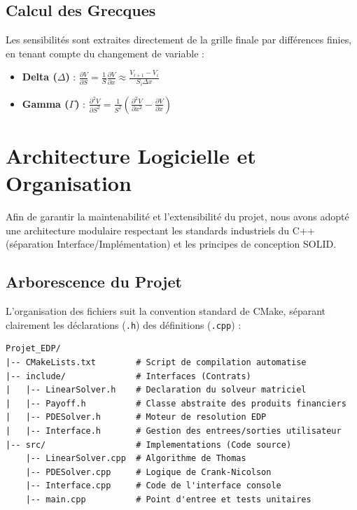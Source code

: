 \documentclass[a4paper,12pt]{article}
\begin{document}
\subsection{Calcul des Grecques}
Les sensibilités sont extraites directement de la grille finale par différences finies, en tenant compte du changement de variable :
\begin{itemize}
    \item \textbf{Delta ($\Delta$)} : $\frac{\partial V}{\partial S} = \frac{1}{S} \frac{\partial V}{\partial x} \approx \frac{V_{i+1}-V_i}{S_i \Delta x}$
    \item \textbf{Gamma ($\Gamma$)} : $\frac{\partial^2 V}{\partial S^2} = \frac{1}{S^2} \left( \frac{\partial^2 V}{\partial x^2} - \frac{\partial V}{\partial x} \right)$
\end{itemize}

\newpage
\section{Architecture Logicielle et Organisation}

Afin de garantir la maintenabilité et l'extensibilité du projet, nous avons adopté une architecture modulaire respectant les standards industriels du C++ (séparation Interface/Implémentation) et les principes de conception SOLID.

\subsection{Arborescence du Projet}
L'organisation des fichiers suit la convention standard de CMake, séparant clairement les déclarations (\texttt{.h}) des définitions (\texttt{.cpp}) :

\begin{lstlisting}[caption={Structure des fichiers du projet}, label={lst:arbo}]
Projet_EDP/
|-- CMakeLists.txt        # Script de compilation automatise
|-- include/              # Interfaces (Contrats)
|   |-- LinearSolver.h    # Declaration du solveur matriciel
|   |-- Payoff.h          # Classe abstraite des produits financiers
|   |-- PDESolver.h       # Moteur de resolution EDP
|   |-- Interface.h       # Gestion des entrees/sorties utilisateur
|-- src/                  # Implementations (Code source)
    |-- LinearSolver.cpp  # Algorithme de Thomas
    |-- PDESolver.cpp     # Logique de Crank-Nicolson
    |-- Interface.cpp     # Code de l'interface console
    |-- main.cpp          # Point d'entree et tests unitaires
\end{lstlisting}
\end{document}
